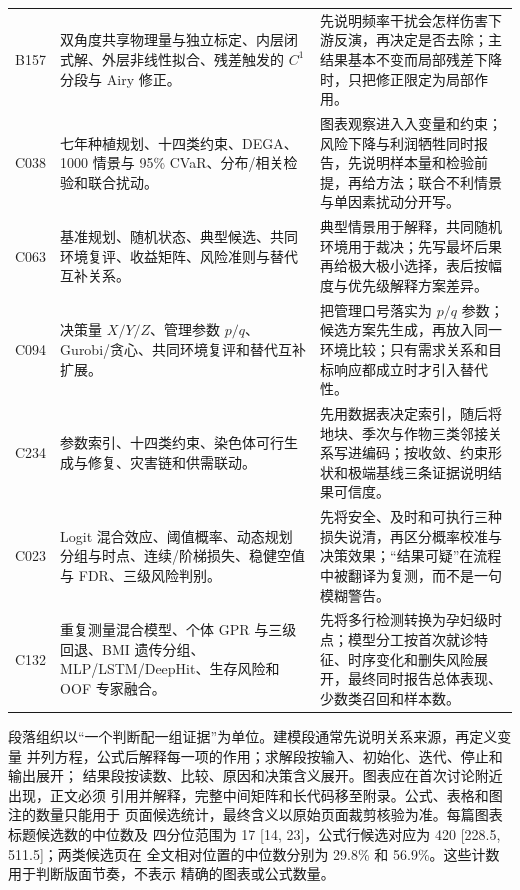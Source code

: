 \begin{longtable}{p{1.4cm}p{5.2cm}p{7.0cm}}
B157 & 双角度共享物理量与独立标定、内层闭式解、外层非线性拟合、残差触发的 $C^1$ 分段与 Airy 修正。 &
先说明频率干扰会怎样伤害下游反演，再决定是否去除；主结果基本不变而局部残差下降时，只把修正限定为局部作用。\\
C038 & 七年种植规划、十四类约束、DEGA、1000 情景与 95\% CVaR、分布/相关检验和联合扰动。 &
图表观察进入入变量和约束；风险下降与利润牺牲同时报告，先说明样本量和检验前提，再给方法；联合不利情景与单因素扰动分开写。\\
C063 & 基准规划、随机状态、典型候选、共同环境复评、收益矩阵、风险准则与替代互补关系。 &
典型情景用于解释，共同随机环境用于裁决；先写最坏后果再给极大极小选择，表后按幅度与优先级解释方案差异。\\
C094 & 决策量 $X/Y/Z$、管理参数 $p/q$、Gurobi/贪心、共同环境复评和替代互补扩展。 &
把管理口号落实为 $p/q$ 参数；候选方案先生成，再放入同一环境比较；只有需求关系和目标响应都成立时才引入替代性。\\
C234 & 参数索引、十四类约束、染色体可行生成与修复、灾害链和供需联动。 &
先用数据表决定索引，随后将地块、季次与作物三类邻接关系写进编码；按收敛、约束形状和极端基线三条证据说明结果可信度。\\
C023 & Logit 混合效应、阈值概率、动态规划分组与时点、连续/阶梯损失、稳健空值与 FDR、三级风险判别。 &
先将安全、及时和可执行三种损失说清，再区分概率校准与决策效果；“结果可疑”在流程中被翻译为复测，而不是一句模糊警告。\\
C132 & 重复测量混合模型、个体 GPR 与三级回退、BMI 遗传分组、MLP/LSTM/DeepHit、生存风险和 OOF 专家融合。 &
先将多行检测转换为孕妇级时点；模型分工按首次就诊特征、时序变化和删失风险展开，最终同时报告总体表现、少数类召回和样本数。\\
\bottomrule
\end{longtable}

段落组织以“一个判断配一组证据”为单位。建模段通常先说明关系来源，再定义变量
并列方程，公式后解释每一项的作用；求解段按输入、初始化、迭代、停止和输出展开；
结果段按读数、比较、原因和决策含义展开。图表应在首次讨论附近出现，正文必须
引用并解释，完整中间矩阵和长代码移至附录。公式、表格和图注的数量只能用于
页面候选统计，最终含义以原始页面裁剪核验为准。每篇图表标题候选数的中位数及
四分位范围为 17 [14, 23]，公式行候选对应为 420 [228.5, 511.5]；两类候选页在
全文相对位置的中位数分别为 29.8\% 和 56.9\%。这些计数用于判断版面节奏，不表示
精确的图表或公式数量。

